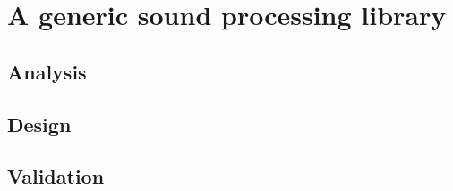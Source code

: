 
\chapter{A generic sound processing library}

\section{Analysis}

\section{Design}

\section{Validation}


